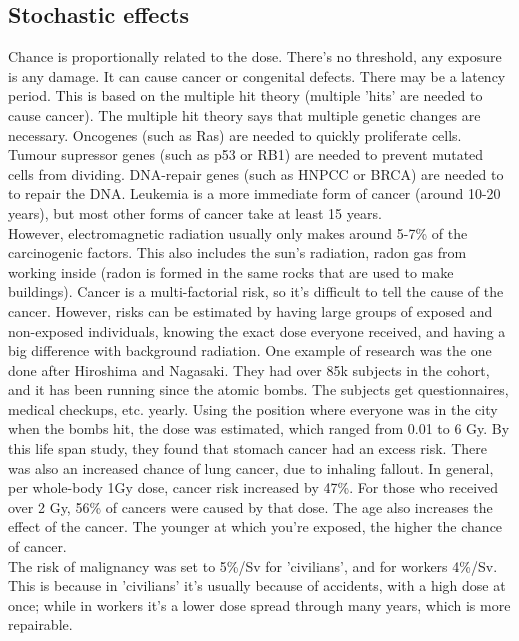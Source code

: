 \subsection{Stochastic effects}
Chance is proportionally related to the dose. There's no threshold, any exposure is any damage. It can cause cancer or congenital defects. There may be a latency period. This is based on the multiple hit theory (multiple 'hits' are needed to cause cancer). The multiple hit theory says that multiple genetic changes are necessary. Oncogenes (such as Ras) are needed to quickly proliferate cells. Tumour supressor genes (such as p53 or RB1) are needed to prevent mutated cells from dividing. DNA-repair genes (such as HNPCC or BRCA) are needed to to repair the DNA. Leukemia is a more immediate form of cancer (around 10-20 years), but most other forms of cancer take at least 15 years. \\
However, electromagnetic radiation usually only makes around 5-7\% of the carcinogenic factors. This also includes the sun's radiation, radon gas from working inside (radon is formed in the same rocks that are used to make buildings). Cancer is a multi-factorial risk, so it's difficult to tell the cause of the cancer. However, risks can be estimated by having large groups of exposed and non-exposed individuals, knowing the exact dose everyone received, and having a big difference with background radiation. One example of research was the one done after Hiroshima and Nagasaki. They had over 85k subjects in the cohort, and it has been running since the atomic bombs. The subjects get questionnaires, medical checkups, etc. yearly. Using the position where everyone was in the city when the bombs hit, the dose was estimated, which ranged from 0.01 to 6 Gy. By this life span study, they found that stomach cancer had an excess risk. There was also an increased chance of lung cancer, due to inhaling fallout. In general, per whole-body 1Gy dose, cancer risk increased by 47\%.  For those who received over 2 Gy, 56\% of cancers were caused by that dose. The age also increases the effect of the cancer. The younger at which you're exposed, the higher the chance of cancer. \\
The risk of malignancy was set to 5\%/Sv for 'civilians', and for workers 4\%/Sv. This is because in 'civilians' it's usually because of accidents, with a high dose at once; while in workers it's a lower dose spread through many years, which is more repairable. \\
